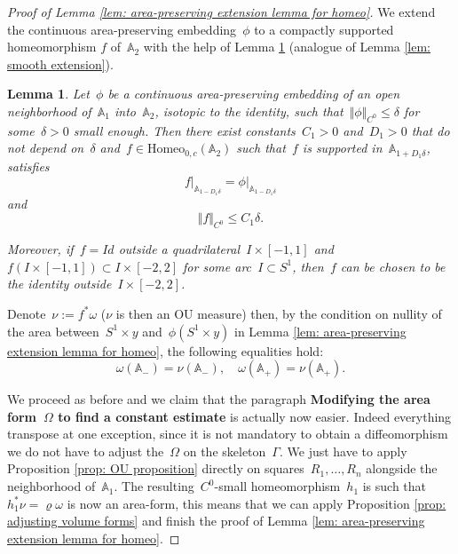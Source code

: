 \documentclass[10pt]{amsart}
\newtheorem{lemma}[prop]{Lemma}
\begin{document}
\begin{proof}[Proof of Lemma \ref{lem: area-preserving extension lemma for homeo}]
We extend the continuous area-preserving embedding~$\phi$ to a compactly supported homeomorphism $f$ of~$\mathbb{A}_2$ with the help of Lemma \ref{lem: continuous extension} (analogue of Lemma \ref{lem: smooth extension}).

\begin{lemma}\label{lem: continuous extension}
Let~$\phi$ be a continuous area-preserving embedding of an open neighborhood of~$\mathbb{A}_1$ into~$\mathbb{A}_2$, isotopic to the identity, such that~$\Vert\phi \Vert_{C^0}  \leq \delta$ for some~$\delta>0$ small enough. Then there exist constants~$C_1>0$ and~$D_1>0$ that do not depend on~$\delta$ and~$f\in \text{Homeo}_{0,c}\left(\mathbb{A}_{2}\right)$ such that~$f$ is supported in~$\mathbb{A}_{1+D_1\delta}$, satisfies
$$f\vert_{\mathbb{A}_{1-D_1\delta}}=\phi\vert_{\mathbb{A}_{1-D_1\delta}}$$
and 
$$\Vert f \Vert_{C^0}\leq C_1\delta.$$

Moreover, if~$f=Id$ outside a quadrilateral~$I\times [-1,1]$ and~$f(I\times [-1,1])\subset I\times [-2,2]$ for some arc~$I\subset S^1$, then~$f$ can be chosen to be the identity outside~$I \times [-2,2]$.
\end{lemma}

Denote~$\nu:=f^*\omega$ ($\nu$ is then an OU measure) then, by the condition on nullity of the area between~$S^1 \times y$ and~$\phi(S^1 \times y)$ in Lemma \ref{lem: area-preserving extension lemma for homeo}, the following equalities hold: 
$$\omega(\mathbb{A}_-) = \nu(\mathbb{A}_-),\quad \omega(\mathbb{A}_+) = \nu(\mathbb{A}_+).$$

We proceed as before and we claim that the paragraph \textbf{Modifying the area form~$\Omega$ to find a constant estimate} is actually now easier. Indeed everything transpose at one exception, since it is not mandatory to obtain a diffeomorphism we do not have to adjust the~$\Omega$ on the skeleton~$\Gamma$. We just have to apply Proposition \ref{prop: OU proposition} directly on squares~$R_1,\ldots, R_n$ alongside the neighborhood of~$\mathbb{A}_1$. The resulting~$C^0$-small homeomorphism~$h_1$ is such that~$h_1^*\nu=\varrho \omega$ is now an area-form, this means that we can apply Proposition \ref{prop: adjusting volume forms} and finish the proof of Lemma \ref{lem: area-preserving extension lemma for homeo}.
\end{proof}

\end{document}
